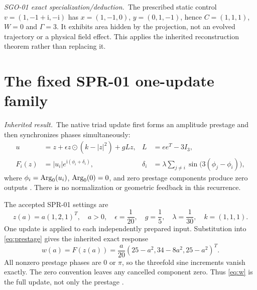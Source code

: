\documentclass[11pt,a4paper]{article}
\newcommand{\ii}{\mathrm i}\newcommand{\tr}{\operatorname{tr}}
\newcommand{\inherited}{\textit{Inherited result.}}
\newcommand{\deduction}{\textit{SGO-01 exact specialization/deduction.}}
\begin{document}
\deduction\ The prescribed static control $v=(1,-1+\ii,-\ii)$ has $x=(1,-1,0)$, $y=(0,1,-1)$, hence $C=(1,1,1)$, $W=0$ and $\Gamma=3$. It exhibits area hidden by the projection, not an evolved trajectory or a physical field effect. This applies the inherited reconstruction theorem rather than replacing it.

\clearpage
\section{The fixed SPR-01 one-update family}\label{sec:family}
\inherited\ The native triad update first forms an amplitude prestage and then synchronizes phases simultaneously:
\begin{align}
u&=z+\epsilon z\odot(k-|z|^2)+gLz,&L&=ee^T-3I_3,\label{eq:prestage}\\
F_i(z)&=|u_i|e^{\ii(\phi_i+\delta_i)},&
\delta_i&=\lambda\sum_{j\ne i}\sin\bigl(3(\phi_j-\phi_i)\bigr),\label{eq:F}
\end{align}
where $\phi_i=\operatorname{Arg}_0(u_i)$, $\operatorname{Arg}_0(0)=0$, and zero prestage components produce zero outputs \cite{paperA,kernel}. There is no normalization or geometric feedback in this recurrence.

The accepted SPR-01 settings are
\begin{equation}
z(a)=a(1,2,1)^T,\quad a>0,\quad
\epsilon=\frac1{20},\quad g=\frac15,\quad\lambda=\frac1{30},\quad k=(1,1,1).
\label{eq:settings}
\end{equation}
One update is applied to each independently prepared input. Substitution into \eqref{eq:prestage} gives the inherited exact response
\begin{equation}
w(a)=F(z(a))=\frac a{20}(25-a^2,34-8a^2,25-a^2)^T.\label{eq:w}
\end{equation}
All nonzero prestage phases are $0$ or $\pi$, so the threefold sine increments vanish exactly. The zero convention leaves any cancelled component zero. Thus \eqref{eq:w} is the full update, not only the prestage \cite{spr01}.
\end{document}
